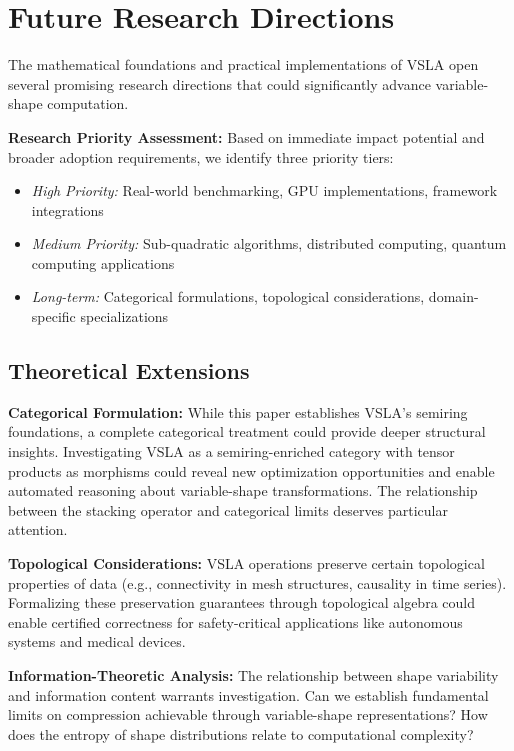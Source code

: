 \section{Future Research Directions}
\label{sec:future}

The mathematical foundations and practical implementations of VSLA open several promising research directions that could significantly advance variable-shape computation.

\textbf{Research Priority Assessment:} Based on immediate impact potential and broader adoption requirements, we identify three priority tiers:
\begin{itemize}
\item \textit{High Priority:} Real-world benchmarking, GPU implementations, framework integrations
\item \textit{Medium Priority:} Sub-quadratic algorithms, distributed computing, quantum computing applications  
\item \textit{Long-term:} Categorical formulations, topological considerations, domain-specific specializations
\end{itemize}

\subsection{Theoretical Extensions}

\textbf{Categorical Formulation:} While this paper establishes VSLA's semiring foundations, a complete categorical treatment could provide deeper structural insights. Investigating VSLA as a semiring-enriched category with tensor products as morphisms could reveal new optimization opportunities and enable automated reasoning about variable-shape transformations. The relationship between the stacking operator and categorical limits deserves particular attention.

\textbf{Topological Considerations:} VSLA operations preserve certain topological properties of data (e.g., connectivity in mesh structures, causality in time series). Formalizing these preservation guarantees through topological algebra could enable certified correctness for safety-critical applications like autonomous systems and medical devices.

\textbf{Information-Theoretic Analysis:} The relationship between shape variability and information content warrants investigation. Can we establish fundamental limits on compression achievable through variable-shape representations? How does the entropy of shape distributions relate to computational complexity?

